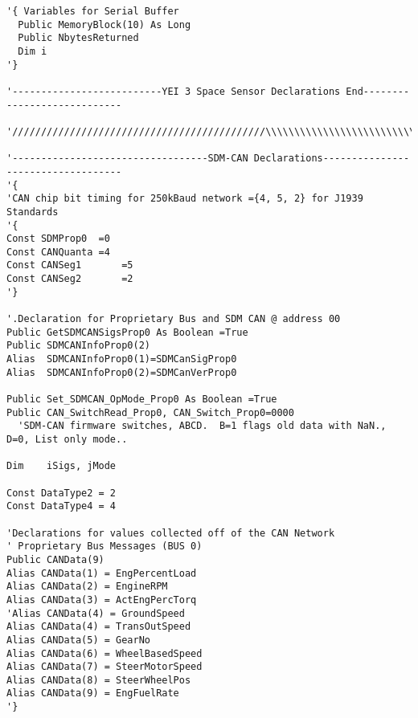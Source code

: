 \begin{lstlisting}[basicstyle=\tiny]
'{ Variables for Serial Buffer
  Public MemoryBlock(10) As Long
  Public NbytesReturned
  Dim i
'}
   
'--------------------------YEI 3 Space Sensor Declarations End----------------------------
  
'////////////////////////////////////////////\\\\\\\\\\\\\\\\\\\\\\\\\\\\\\\\\\\\\\\\\\\\\

'----------------------------------SDM-CAN Declarations-----------------------------------
'{
'CAN chip bit timing for 250kBaud network ={4, 5, 2} for J1939 Standards
'{
Const SDMProp0	=0
Const CANQuanta	=4
Const CANSeg1		=5
Const CANSeg2		=2
'}

'.Declaration for Proprietary Bus and SDM CAN @ address 00
Public GetSDMCANSigsProp0 As Boolean =True
Public SDMCANInfoProp0(2)
Alias  SDMCANInfoProp0(1)=SDMCanSigProp0
Alias  SDMCANInfoProp0(2)=SDMCanVerProp0

Public Set_SDMCAN_OpMode_Prop0 As Boolean =True
Public CAN_SwitchRead_Prop0, CAN_Switch_Prop0=0000
  'SDM-CAN firmware switches, ABCD.  B=1 flags old data with NaN., D=0, List only mode..

Dim    iSigs, jMode

Const DataType2 = 2
Const DataType4 = 4

'Declarations for values collected off of the CAN Network
' Proprietary Bus Messages (BUS 0)
Public CANData(9)
Alias CANData(1) = EngPercentLoad
Alias CANData(2) = EngineRPM
Alias CANData(3) = ActEngPercTorq
'Alias CANData(4) = GroundSpeed
Alias CANData(4) = TransOutSpeed
Alias CANData(5) = GearNo
Alias CANData(6) = WheelBasedSpeed
Alias CANData(7) = SteerMotorSpeed
Alias CANData(8) = SteerWheelPos
Alias CANData(9) = EngFuelRate
'}


\end{lstlisting}
